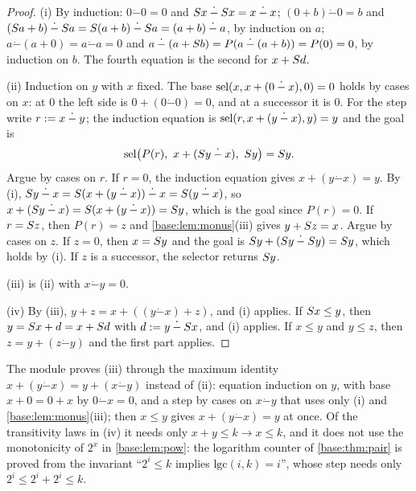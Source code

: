 \begin{proof}
(i) By induction: $0\mathbin{\dot-}0=0$ and
$S x\mathbin{\dot-}S x=x\mathbin{\dot-}x$;
$(0+b)\mathbin{\dot-}0=b$ and
$(S a+b)\mathbin{\dot-}S a=S(a+b)\mathbin{\dot-}S a
 =(a+b)\mathbin{\dot-}a$, by induction on $a$;
$a\mathbin{\dot-}(a+0)=a\mathbin{\dot-}a=0$ and
$a\mathbin{\dot-}(a+S b)=P(a\mathbin{\dot-}(a+b))=P(0)=0$, by induction
on $b$.  The fourth equation is the second for $x+S d$.

(ii) Induction on $y$ with $x$ fixed.  The base
$\operatorname{sel}(x,x+(0\mathbin{\dot-}x),0)=0$ holds by cases on $x$: at $0$ the left
side is $0+(0\mathbin{\dot-}0)=0$, and at a successor it is $0$.  For the
step write $r\mathrel{:=} x\mathbin{\dot-}y$; the induction equation is
$\operatorname{sel}(r,x+(y\mathbin{\dot-}x),y)=y$ and the goal is
\[
 \operatorname{sel}\bigl(P(r),\ x+(S y\mathbin{\dot-}x),\ S y\bigr)=S y .
\]
Argue by cases on $r$.  If $r=0$, the induction equation gives
$x+(y\mathbin{\dot-}x)=y$.  By (i),
$S y\mathbin{\dot-}x=S(x+(y\mathbin{\dot-}x))\mathbin{\dot-}x
 =S(y\mathbin{\dot-}x)$, so
$x+(S y\mathbin{\dot-}x)=S(x+(y\mathbin{\dot-}x))=S y$, which is
the goal since $P(r)=0$.  If $r=S z$, then $P(r)=z$ and
\cref{base:lem:monus}(iii) gives $y+S z=x$.  Argue by cases on $z$.  If
$z=0$, then $x=S y$ and the goal is
$S y+(S y\mathbin{\dot-}S y)=S y$, which holds by (i).  If $z$
is a successor, the selector returns $S y$.

(iii) is (ii) with $x\mathbin{\dot-}y=0$.

(iv) By (iii), $y+z=x+((y\mathbin{\dot-}x)+z)$, and (i) applies.  If
$S x\le y$, then $y=S x+d=x+S d$ with
$d\mathrel{:=} y\mathbin{\dot-}S x$, and (i) applies.  If $x\le y$ and
$y\le z$, then $z=y+(z\mathbin{\dot-}y)$ and the first part applies.
\end{proof}

\begin{remark}
\label{base:rem:orderlean}
The module  proves (iii) through the maximum identity
$x+(y\mathbin{\dot-}x)=y+(x\mathbin{\dot-}y)$ instead of (ii): equation
induction on $y$, with base $x+0=0+x$ by $0\mathbin{\dot-}x=0$, and a step
by cases on $x\mathbin{\dot-}y$ that uses only (i) and
\cref{base:lem:monus}(iii); then $x\le y$ gives $x+(y\mathbin{\dot-}x)=y$
at once.  Of the transitivity laws in (iv) it needs only
$x+y\le k\to x\le k$, and it does not use the monotonicity of $2^{x}$ in
\cref{base:lem:pow}: the logarithm counter of \cref{base:thm:pair} is
proved from the invariant ``$2^{i}\le k$ implies $\mathrm{lgc}(i,k)=i$'',
whose step needs only $2^{i}\le 2^{i}+2^{i}\le k$.
\end{remark}


